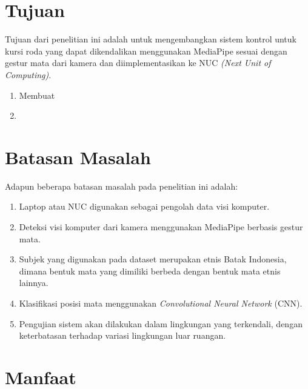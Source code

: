 \section{Tujuan}
\label{sec:Tujuan}

Tujuan dari penelitian ini adalah untuk mengembangkan sistem kontrol untuk kursi roda yang dapat dikendalikan menggunakan MediaPipe sesuai dengan gestur mata dari kamera dan diimplementasikan ke NUC \textit{(Next Unit of Computing)}.

\begin{enumerate}[nolistsep]

  \item Membuat \lipsum[2][1-3]

  \item \lipsum[3][1-3]

\end{enumerate}

\section{Batasan Masalah}
\label{sec:batasanmasalah}

Adapun beberapa batasan masalah pada penelitian ini adalah:

\begin{enumerate}[nolistsep]

  \item Laptop atau NUC digunakan sebagai pengolah data visi komputer.
  
  \item Deteksi visi komputer dari kamera menggunakan MediaPipe berbasis gestur mata.

  \item Subjek yang digunakan pada dataset merupakan etnis Batak Indonesia, dimana bentuk mata yang dimiliki berbeda dengan bentuk mata etnis lainnya.

  \item Klasifikasi posisi mata menggunakan \emph{Convolutional Neural Network} (CNN).

  \item Pengujian sistem akan dilakukan dalam lingkungan yang terkendali, dengan keterbatasan terhadap variasi lingkungan luar ruangan.

\end{enumerate}

\section{Manfaat}

